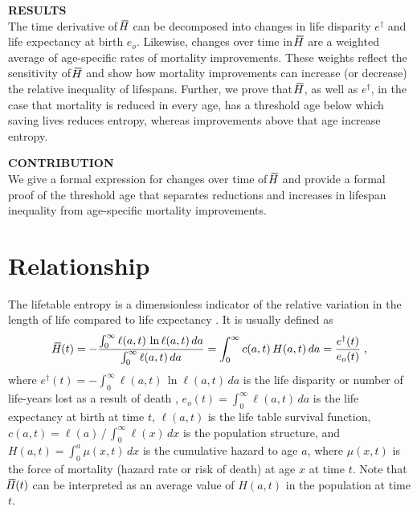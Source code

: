 \documentclass[a4paper,twoside, openright, 12pt, leqno]{article}
\newcommand*\xbar[1]{%
   \hbox{%
     \vbox{%
       \hrule height 0.5pt %
       \kern0.3ex%
       \hbox{%
         \kern-0.25em%
         \ensuremath{#1}%
         \kern-0.05em%
       }%
     }%
   }%
}
\begin{document}
\noindent\textbf{RESULTS} \\
The time derivative of $\xbar{H}$ can be decomposed into changes in life disparity $e^\dagger$ and life expectancy at birth $e_o$. Likewise, changes over time in $\xbar{H}$ are a weighted average of age-specific rates of mortality improvements. These weights reflect the sensitivity of $\xbar{H}$ and show how mortality improvements can increase (or decrease) the relative inequality of lifespans. Further, we prove that $\xbar{H}$, as well as $e^\dagger$, in the case that mortality is reduced in every age, has a threshold age below which saving lives reduces entropy, whereas improvements above that age increase entropy.
\bigskip

\noindent\textbf{CONTRIBUTION} \\
We give a formal expression for changes over time of $\xbar{H}$ and provide a formal proof of the threshold age that separates reductions and increases in lifespan inequality from age-specific mortality improvements.

\linespread{1.5}\normalsize
\clearpage



\section{Relationship}
The lifetable entropy is a dimensionless indicator of the relative variation in the length of life compared to life expectancy \citep{keyfitz1968introduction,demetrius1974demographic,Keyfitz1977, demetrius1978adaptive}. It is usually defined as
%
\begin{equation*}
\xbar{H}(t)=-\frac{\int_0^\infty\ell(a, t)\,\ln\ell(a, t)\,da}{\int_0^\infty\ell(a, t)\,da}=\int_0^\infty c(a, t)\,H(a,t)\,da=\frac{e^\dagger(t)}{e_o(t)}\;,
\end{equation*}
%
where $e^\dagger(t)=-\int_0^\infty\ell(a,t)\,\ln\ell(a,t)\,da$ is the life disparity or number of life-years lost as a result of death \citep{Vaupel2003}, $e_o(t)=\int_0^\infty\ell(a, t)\,da$ is the life expectancy at birth at time $t$, $\ell(a,t)$ is the life table survival function, $c(a,t)=\ell(a)\,/\,\int_0^\infty\ell(x)\,dx$ is the population structure, and $H(a,t)=\int_0^a\mu(x,t)\,dx$ is the cumulative hazard to age $a$, where $\mu(x,t)$ is the force of mortality (hazard rate or risk of death) at age $x$ at time $t$. Note that $\xbar{H}(t)$ can be interpreted as an average value of $H(a,t)$ in the population at time $t$.
\end{document}
